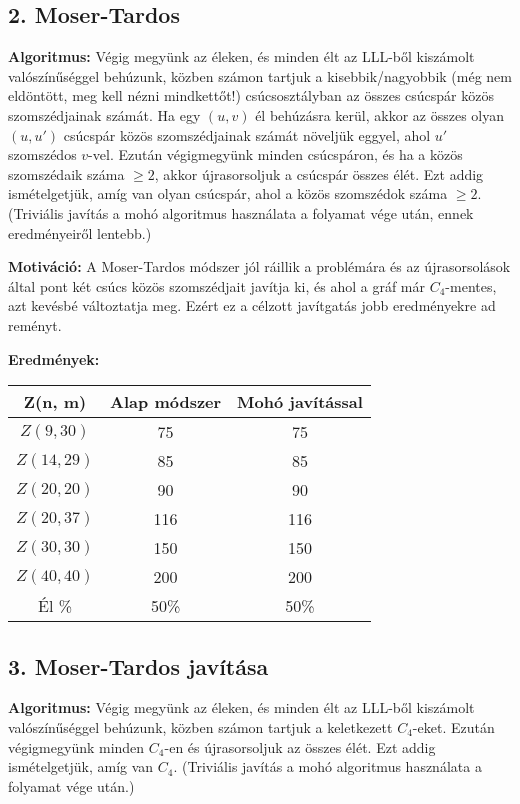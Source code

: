 \documentclass[12pt,a4paper]{article}
\begin{document}
\subsection*{2. Moser-Tardos}

\textbf{Algoritmus:} Végig megyünk az éleken, és minden élt az LLL-ből kiszámolt valószínűséggel behúzunk, közben számon tartjuk a kisebbik/nagyobbik (még nem eldöntött, meg kell nézni mindkettőt!) csúcsosztályban az összes csúcspár közös szomszédjainak számát. Ha egy $(u,v)$ él behúzásra kerül, akkor az összes olyan $(u,u')$ csúcspár közös szomszédjainak számát növeljük eggyel, ahol $u'$ szomszédos $v$-vel. Ezután végigmegyünk minden csúcspáron, és ha a közös szomszédaik száma $\geq 2$, akkor újrasorsoljuk a csúcspár összes élét. Ezt addig ismételgetjük, amíg van olyan csúcspár, ahol a közös szomszédok száma $\geq 2$. (Triviális javítás a mohó algoritmus használata a folyamat vége után, ennek eredményeiről lentebb.)

\textbf{Motiváció:} A Moser-Tardos módszer jól ráillik a problémára és az újrasorsolások által pont két csúcs közös szomszédjait javítja ki, és ahol a gráf már $C_4$-mentes, azt kevésbé változtatja meg. Ezért ez a célzott javítgatás jobb eredményekre ad reményt.

\textbf{Eredmények:}
\begin{table}[H]
\centering
\begin{tabular}{|c|c|c|}
\hline
\textbf{Z(n, m)} & \textbf{Alap módszer} & \textbf{Mohó javítással} \\
\hline
$Z(9,30)$  & 75 & 75 \\
$Z(14, 29)$ & 85 & 85 \\
$Z(20, 20)$ & 90 & 90 \\
$Z(20, 37)$ & 116 & 116 \\
$Z(30, 30)$ & 150 & 150 \\
$Z(40, 40)$ & 200 & 200 \\
\hline
Él \% & 50\% & 50\% \\
\hline
\end{tabular}
\end{table}

\subsection*{3. Moser-Tardos javítása}

\textbf{Algoritmus:} Végig megyünk az éleken, és minden élt az LLL-ből kiszámolt valószínűséggel behúzunk, közben számon tartjuk a keletkezett $C_4$-eket. Ezután végigmegyünk minden $C_4$-en és újrasorsoljuk az összes élét. Ezt addig ismételgetjük, amíg van $C_4$. (Triviális javítás a mohó algoritmus használata a folyamat vége után.)
\end{document}

